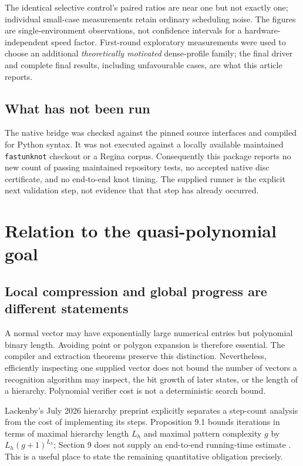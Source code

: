 \documentclass[11pt]{article}
\theoremstyle{definition}\newtheorem{definition}[theorem]{Definition}
\theoremstyle{remark}\newtheorem{remark}[theorem]{Remark}
\begin{document}
The identical selective control's paired ratios are near one but not exactly
one; individual small-case measurements retain ordinary scheduling noise.
The figures are single-environment observations, not confidence intervals for a
hardware-independent speed factor. First-round exploratory measurements were
used to choose an additional \emph{theoretically motivated} dense-profile family;
the final driver and complete final results, including unfavourable cases, are
what this article reports.

\subsection{What has not been run}
The native bridge was checked against the pinned source interfaces and compiled
for Python syntax. It was not executed against a locally available maintained
\texttt{fastunknot} checkout or a Regina corpus. Consequently this package reports
no new count of passing maintained repository tests, no accepted native disc
certificate, and no end-to-end knot timing. The supplied
 runner is the explicit next validation step,
not evidence that that step has already occurred.

\section{Relation to the quasi-polynomial goal}
\label{sec:global}

\subsection{Local compression and global progress are different statements}
A normal vector may have exponentially large numerical entries but polynomial
binary length. Avoiding point or polygon expansion is therefore essential.
The compiler and extraction theorems preserve this distinction. Nevertheless,
efficiently inspecting one supplied vector does not bound the number of vectors
a recognition algorithm may inspect, the bit growth of later states, or the
length of a hierarchy. Polynomial verifier cost is not a deterministic search
bound.

Lackenby's July 2026 hierarchy preprint explicitly separates a step-count analysis
from the cost of implementing its steps. Proposition 9.1 bounds iterations in
terms of maximal hierarchy length $L_h$ and maximal pattern complexity $g$ by
$L_h(g+1)^{L_h}$; Section 9 does not supply an end-to-end running-time estimate
\cite[Section 9]{lackenby}. This is a useful place to state the remaining
quantitative obligation precisely.
\end{document}
